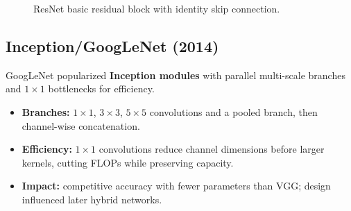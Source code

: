 \begin{figure}[h]
    \centering
    \caption{ResNet basic residual block with identity skip connection.}
    \label{fig:resnet-block}
\end{figure}

\subsection{Inception/GoogLeNet (2014)}
\label{subsec:inception}

GoogLeNet popularized \textbf{Inception modules} with parallel multi-scale branches and $1\times1$ bottlenecks for efficiency.
\begin{itemize}
    \item \textbf{Branches:} $1\times1$, $3\times3$, $5\times5$ convolutions and a pooled branch, then channel-wise concatenation.
    \item \textbf{Efficiency:} $1\times1$ convolutions reduce channel dimensions before larger kernels, cutting FLOPs while preserving capacity.
    \item \textbf{Impact:} competitive accuracy with fewer parameters than VGG; design influenced later hybrid networks.
\end{itemize}

